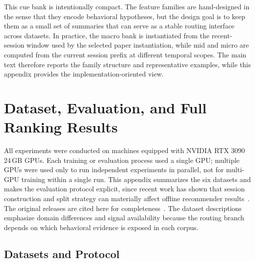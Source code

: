 \documentclass[sigconf,review,anonymous]{acmart}
\begin{document}
This cue bank is intentionally compact. The feature families are hand-designed in the sense that they encode behavioral hypotheses, but the design goal is to keep them as a small set of summaries that can serve as a stable routing interface across datasets. In practice, the macro bank is instantiated from the recent-session window used by the selected paper instantiation, while mid and micro are computed from the current session prefix at different temporal scopes. The main text therefore reports the family structure and representative examples, while this appendix provides the implementation-oriented view.



\section{Dataset, Evaluation, and Full Ranking Results}

All experiments were conducted on machines equipped with NVIDIA RTX 3090 24\,GB GPUs. Each training or evaluation process used a single GPU; multiple GPUs were used only to run independent experiments in parallel, not for multi-GPU training within a single run.
\label{app:data-details}
This appendix summarizes the six datasets and makes the evaluation protocol explicit, since recent work has shown that session construction and split strategy can materially affect offline recommender results~\cite{ji2023leakage,gusak2025timesplit}. The original releases are cited here for completeness~\cite{mcauley2015amazon,yang2015foursquare,gao2022kuairec,celma2010music,harper2015movielens,retailrocket2015dataset}. The dataset descriptions emphasize domain differences and signal availability because the routing branch depends on which behavioral evidence is exposed in each corpus.

\subsection{Datasets and Protocol}
\end{document}
